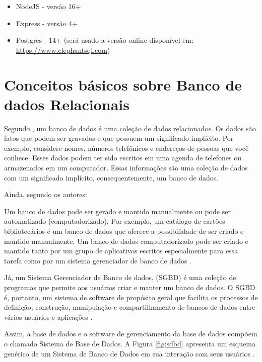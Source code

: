\begin{itemize}
	\item NodeJS - versão 16+
	\item Express - versão 4+
	\item Postgres - 14+ (será usado a versão online disponível em: \url{https://www.elephantsql.com})
\end{itemize}

\section{Conceitos básicos sobre Banco de dados Relacionais}

Segundo , um banco de dados é uma coleção de dados relacionados. Os dados são fatos que podem ser gravados e que possuem um significado implícito. Por exemplo, considere nomes, números telefônicos e endereços de pessoas que você conhece. Esses dados podem ter sido escritos em uma agenda de telefones ou armazenados em um computador. Essas informações são uma coleção de dados com um significado implícito, consequentemente, um banco de dados.

Ainda, segundo os autores:

\begin{citacao}
	Um banco de dados pode ser gerado e mantido manualmente ou pode ser automatizado (computadorizado). Por exemplo, um catálogo de cartões bibliotecários é um banco de dados que oferece a possibilidade de ser criado e mantido manualmente. Um banco de dados computadorizado pode ser criado e mantido tanto por um grupo de aplicativos escritos especialmente para essa tarefa como por um sistema gerenciador de banco de dados \cite[p. 04]{elmasri2005sistemas}.
\end{citacao}

Já, um Sistema Gerenciador de Banco de dados, (SGBD) é uma coleção de programas que permite aos usuários criar e manter um banco de dados. O SGBD é, portanto, um sistema de software de propósito geral que facilita os processos de definição, construção, manipulação e compartilhamento de bancos de dados entre vários usuários e aplicações \cite{elmasri2005sistemas}. 

Assim, a base de dados e o software de gerenciamento da base de dados compõem o chamado Sistema de Base de Dados. A Figura \ref{fig:sdbd} apresenta um esquema genérico de um Sistema de Banco de Dados em sua interação com seus usuários \cite{takai2005introduccao}.

